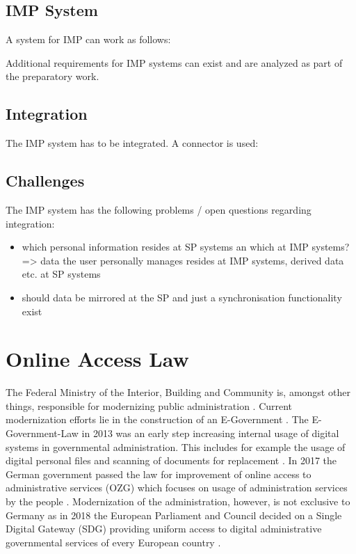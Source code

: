 \documentclass[
     12pt,         %
     a4paper,      %
     BCOR=10mm,version=first,     %
     DIV=14,version=first,        %
     ]{scrreprt}
\begin{document}
\subsection{IMP System}
A system for IMP can work as follows:

Additional requirements for IMP systems can exist and are analyzed as part of the preparatory work.

\subsection{Integration}
The IMP system has to be integrated. A connector is used:

\subsection{Challenges}
The IMP system has the following problems / open questions regarding integration:
\begin{itemize}
    \item which personal information resides at SP systems an which at IMP systems? => data the user personally manages resides at IMP systems, derived data etc. at SP systems
    \item should data be mirrored at the SP and just a synchronisation functionality exist
\end{itemize}

\section{Online Access Law}
The Federal Ministry of the Interior, Building and Community is, amongst other things, responsible for modernizing public administration \cite{BMI:Moderne_Verwaltung}. Current modernization efforts lie in the construction of an E-Government \cite{BMI:Behoerdengaenge}.
The E-Government-Law in 2013 was an early step increasing internal usage of digital systems in governmental administration. This includes for example the usage of digital personal files and scanning of documents for replacement \cite{BMI:E-Government_Gesetz}. 
In 2017 the German government passed the law for improvement of online access to administrative services (OZG) which focuses on usage of administration services by the people \cite{BMI:Onlinezugangsgesetz}. 
Modernization of the administration, however, is not exclusive to Germany as in 2018 the European Parliament and Council decided on a Single Digital Gateway (SDG) providing uniform access to digital administrative governmental services of every European country \cite{BMI:Single_Digital_Gateway}.
\end{document}
